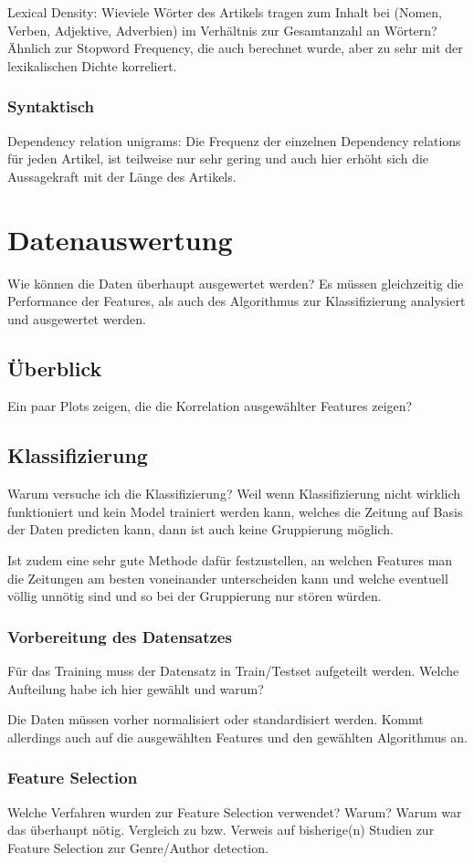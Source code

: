 Lexical Density: Wieviele Wörter des Artikels tragen zum Inhalt bei (Nomen, Verben, Adjektive, Adverbien) im Verhältnis zur Gesamtanzahl an Wörtern? Ähnlich zur Stopword Frequency, die auch berechnet wurde, aber zu sehr mit der lexikalischen Dichte korreliert.
\subsection{Syntaktisch}
Dependency relation unigrams: Die Frequenz der einzelnen Dependency relations für jeden Artikel, ist teilweise nur sehr gering und auch hier erhöht sich die Aussagekraft mit der Länge des Artikels.

\chapter{Datenauswertung}
Wie können die Daten überhaupt ausgewertet werden? Es müssen gleichzeitig die Performance der Features, als auch des Algorithmus zur Klassifizierung analysiert und ausgewertet werden.
\section{Überblick}
Ein paar Plots zeigen, die die Korrelation ausgewählter Features zeigen?
\section{Klassifizierung}
Warum versuche ich die Klassifizierung? Weil wenn Klassifizierung nicht wirklich funktioniert und kein Model trainiert werden kann, welches die Zeitung auf Basis der Daten predicten kann, dann ist auch keine Gruppierung möglich.

Ist zudem eine sehr gute Methode dafür festzustellen, an welchen Features man die Zeitungen am besten voneinander unterscheiden kann und welche eventuell völlig unnötig sind und so bei der Gruppierung nur stören würden.
\subsection{Vorbereitung des Datensatzes}
Für das Training muss der Datensatz in Train/Testset aufgeteilt werden. Welche Aufteilung habe ich hier gewählt und warum?

Die Daten müssen vorher normalisiert oder standardisiert werden.
Kommt allerdings auch auf die ausgewählten Features und den gewählten Algorithmus an.
\subsection{Feature Selection}
Welche Verfahren wurden zur Feature Selection verwendet? Warum? Warum war das überhaupt nötig. Vergleich zu bzw. Verweis auf bisherige(n) Studien zur Feature Selection zur Genre/Author detection.

